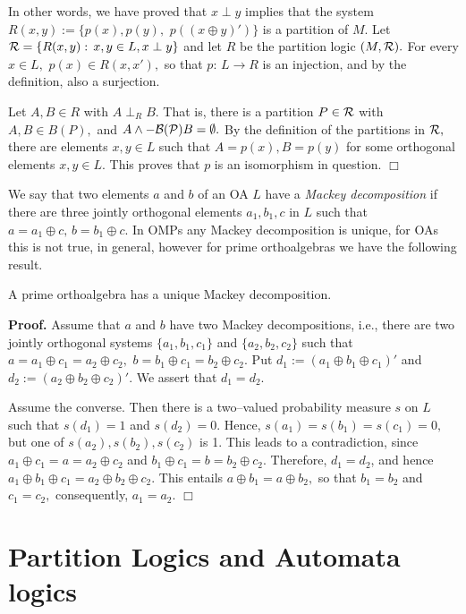 In other words, we have proved that $x\perp y$ implies that the system
$R(x,y) := \{p(x), p(y),$ $ p((x\oplus y)')\}$ is a partition of $M.$
Let ${\cal{R}} = \{R(x,y):\, x,y \in L, x \perp y\}$ and let $R$
be the partition logic $(M,{\cal{R}}).$ For every $x \in L,$ $p(x)
\in R(x,x'),$ so that $p:\, L \to R$ is an injection, and by the
definition, also a surjection.

Let $A,B \in R$ with $A \perp_R B.$ That is, there is a partition
$P \in {\cal{R}}$ with $A,B \in B(P),$ and $A\wedge -{\cal {B(P)}} B =
\emptyset.$
By the definition of the partitions in $\cal R,$ there are elements
$x,y \in L$ such that $A = p(x), B= p(y)$ for some orthogonal
elements  $x,y \in L.$ This proves that $p$ is an isomorphism in question.
\hfill $\Box$

We say that two elements $a$ and $b$ of an OA $L$ have a {\it Mackey
decomposition} if there are three jointly orthogonal elements
$a_1, b_1, c$ in $L$ such that $a = a_1 \oplus c,\, b = b_1 \oplus
c.$ In OMPs any Mackey decomposition is unique, for OAs this is
not true, in general, however for prime orthoalgebras we have
the following result.

\begin{proposition}\label{prop5.3} A prime orthoalgebra has a unique
Mackey decomposition.
\end{proposition}

{\bf Proof.} Assume that $a$ and $b$ have two Mackey decompositions,
i.e., there are two jointly orthogonal systems $\{a_1, b_1, c_1\}
$ and $\{a_2, b_2, c_2\}$ such that $a = a_1 \oplus c_1 = a_2
\oplus c_2,$ $b= b_1 \oplus c_1 = b_2 \oplus c_2.$ Put $d_1 :=
(a_1 \oplus b_1 \oplus c_1)'$ and $d_2 := (a_2 \oplus b_2 \oplus
c_2)'.$ We assert that $d_1 = d_2.$

Assume the converse. Then there is a two--valued probability measure $s$ on
$L$ such that $s(d_1) = 1$ and $s(d_2) = 0.$ Hence, $s(a_1) = s(b_1)
=s(c_1) = 0,$ but one of $s(a_2), s(b_2), s(c_2) $ is 1. This
leads to
a contradiction, since $a_1 \oplus c_1 = a= a_2 \oplus c_2$ and
$b_1 \oplus c_1 = b = b_2 \oplus c_2.$ Therefore, $d_1 = d_2$,
and hence $a_1 \oplus b_1 \oplus c_1 = a_2 \oplus b_2 \oplus c_2.$
This entails $a \oplus b_1 = a \oplus b_2,$ so that $ b_1 = b_2$ and
$c_1 = c_2,$ consequently, $a_1 = a_2.$ \hfill$ \Box$

\section{Partition Logics and Automata logics}

